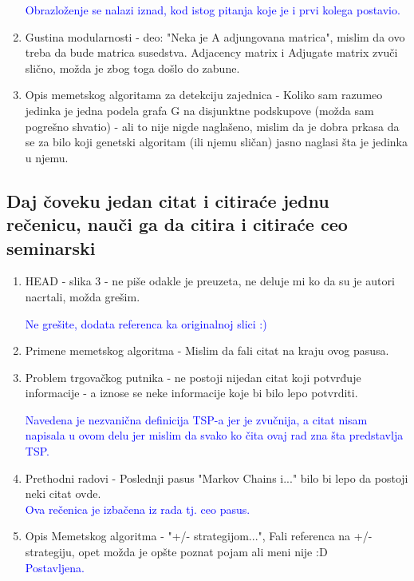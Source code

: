 \documentclass[a4paper]{report}
\newcommand{\odgovor}[1]{\textcolor{blue}{#1}}
\begin{document}
\begin{enumerate}
    \odgovor{ Obrazloženje se nalazi iznad, kod istog pitanja koje je i prvi kolega postavio. } 
    
 \item Gustina modularnosti - deo: "Neka je A adjungovana matrica", mislim da ovo treba da bude matrica susedstva. Adjacency matrix i Adjugate matrix zvuči slično, možda je zbog toga došlo do zabune.
  \item Opis memetskog algoritama za detekciju zajednica - Koliko sam razumeo jedinka je jedna podela grafa G na disjunktne podskupove (možda sam pogrešno shvatio) - ali to nije nigde naglašeno, mislim da je dobra prkasa da se za bilo koji genetski algoritam (ili njemu sličan) jasno naglasi šta je jedinka u njemu.
\end{enumerate}

\subsection{Daj čoveku jedan citat i citiraće jednu rečenicu, nauči ga da citira i citiraće ceo seminarski}
\begin{enumerate}
  \item HEAD - slika 3 - ne piše odakle je preuzeta, ne deluje mi ko da su je autori nacrtali, možda grešim.
  
  \odgovor{Ne grešite, dodata referenca ka originalnoj slici :)}
  \item Primene memetskog algoritma - Mislim da fali citat na kraju ovog pasusa.
  \item Problem trgovačkog putnika - ne postoji nijedan citat koji potvrđuje informacije - a iznose se neke informacije koje bi bilo lepo potvrditi.
  
  \odgovor{ Navedena je nezvanična definicija TSP-a jer je zvučnija, a citat nisam napisala u ovom delu jer mislim da svako ko čita ovaj rad zna šta predstavlja TSP.}
  \item Prethodni radovi - Poslednji pasus "Markov Chains i..."  bilo bi lepo da postoji neki citat ovde. \\
    \odgovor{Ova rečenica je izbačena iz rada tj. ceo pasus.}
  
  \item Opis Memetskog algoritma - "+/- strategijom...", Fali referenca na +/- strategiju, opet možda je opšte poznat pojam ali meni nije :D \\
  \odgovor{Postavljena. \\}
  
\end{enumerate}
\end{document}
